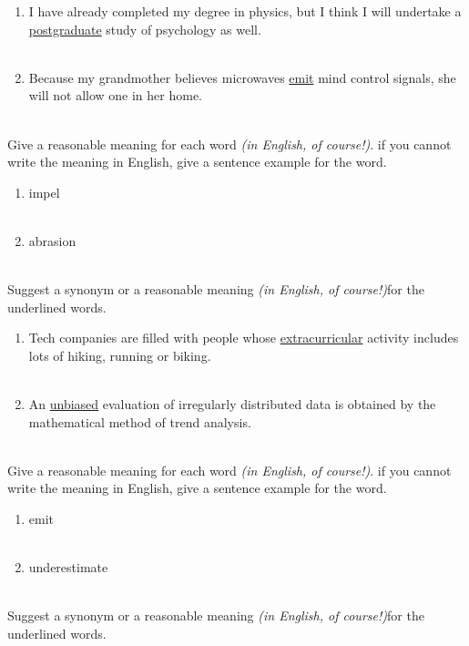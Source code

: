 \documentclass{exam}
\begin{document}
\begin{questions}
\begin{enumerate}
	\item I have already completed my degree in physics, but I think I will undertake a \underline{postgraduate} study of psychology as well.\\ \\
	\item Because my grandmother believes microwaves \underline{emit} mind control signals, she will not allow one in her home.\\ \\
\end{enumerate}
\question Give a reasonable meaning for each word \emph{(in English, of course!)}. if you cannot write the meaning in English, give a sentence example for the word.\\
\begin{enumerate}
	\item impel \\ \\
	\item abrasion \\ \\
\end{enumerate}
\question Suggest a synonym or a reasonable meaning \emph{(in English, of course!)}for the underlined words.\\
\begin{enumerate}
	\item Tech companies are filled with people whose \underline{extracurricular} activity includes lots of hiking, running or biking.\\ \\
	\item An \underline{unbiased} evaluation of irregularly distributed data is obtained by the mathematical method of trend analysis.\\ \\
\end{enumerate}
\question Give a reasonable meaning for each word \emph{(in English, of course!)}. if you cannot write the meaning in English, give a sentence example for the word.\\
\begin{enumerate}
	\item emit \\ \\
	\item underestimate \\ \\
\end{enumerate}
\question Suggest a synonym or a reasonable meaning \emph{(in English, of course!)}for the underlined words.\\

\end{questions}
\end{document}
